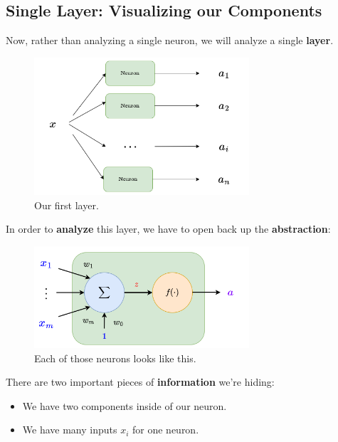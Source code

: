 
    \subsection*{Single Layer: Visualizing our Components}
    
        Now, rather than analyzing a single neuron, we will analyze a single \textbf{layer}.
        
        \begin{figure}[H]
            \centering
            \includegraphics[width=80mm,scale=0.4]{images/nn_images/general_layer.png}
            \caption*{Our first layer.}
        \end{figure}
        
        In order to \textbf{analyze} this layer, we have to open back up the \textbf{abstraction}:
        
        \begin{figure}[H]
            \centering
            \includegraphics[width=80mm,scale=0.4]{images/nn_images/neuron_inside.png}
            \caption*{Each of those neurons looks like this.}
        \end{figure}
        
        There are two important pieces of \textbf{information} we're hiding:
        
        \begin{itemize}
            \item We have two components inside of our neuron.
            
            \item We have many inputs $x_i$ for one neuron.
        \end{itemize}
        
